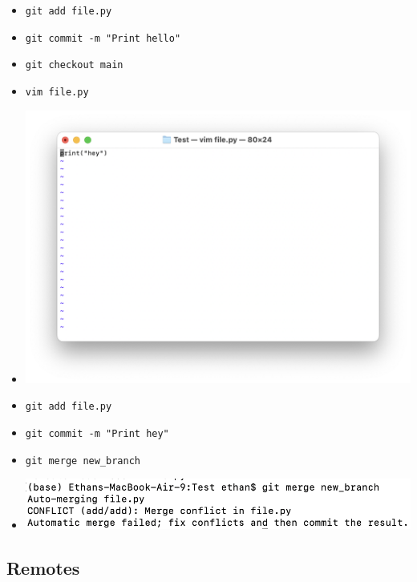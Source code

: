 \documentclass[10pt,twocolumn]{article}
\begin{document}
\begin{enumerate}
\begin{itemize}
            \item \texttt{git add file.py}
            \item \texttt{git commit -m "Print hello"}
            \item \texttt{git checkout main}
            \item \texttt{vim file.py}
            \item \includegraphics[width=0.5\linewidth]{Images/3.png}
            \item \texttt{git add file.py}
            \item \texttt{git commit -m "Print hey"}
            \item \texttt{git merge new\_branch}
            \item \includegraphics[width=0.5\linewidth]{Images/4.png}
        \end{itemize}
\end{enumerate}

\subsection{Remotes}
\end{document}
